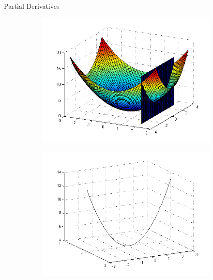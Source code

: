 \documentclass[11pt, xcolor={dvipsnames}, hyperref={colorlinks, allcolors=Blue}]{beamer}
\begin{document}
\begin{frame}{Partial Derivatives}
\begin{figure}
	\begin{subfigure}[b]{0.48\textwidth}
		\centering
		\includegraphics[width=\textwidth]{planeslice.png}
	\end{subfigure}
	\begin{subfigure}[b]{0.48\textwidth}
		\centering
		\includegraphics[width=\textwidth]{partial.png}
	\end{subfigure}
\end{figure}

\end{frame}
\end{document}
